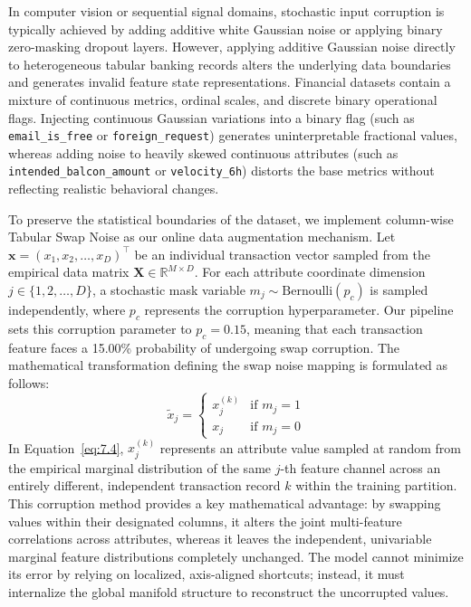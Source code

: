 In computer vision or sequential signal domains, stochastic input corruption is typically achieved by adding additive white Gaussian noise or applying binary zero-masking dropout layers. However, applying additive Gaussian noise directly to heterogeneous tabular banking records alters the underlying data boundaries and generates invalid feature state representations. Financial datasets contain a mixture of continuous metrics, ordinal scales, and discrete binary operational flags. Injecting continuous Gaussian variations into a binary flag (such as \texttt{email\_is\_free} or \texttt{foreign\_request}) generates uninterpretable fractional values, whereas adding noise to heavily skewed continuous attributes (such as \texttt{intended\_balcon\_amount} or \texttt{velocity\_6h}) distorts the base metrics without reflecting realistic behavioral changes.

To preserve the statistical boundaries of the dataset, we implement column-wise Tabular Swap Noise as our online data augmentation mechanism. Let $\mathbf{x} = (x_1, x_2, \ldots, x_D)^\top$ be an individual transaction vector sampled from the empirical data matrix $\mathbf{X} \in \mathbb{R}^{M \times D}$. For each attribute coordinate dimension $j \in \{1, 2, \ldots, D\}$, a stochastic mask variable $m_j \sim \text{Bernoulli}(p_c)$ is sampled independently, where $p_c$ represents the corruption hyperparameter. Our pipeline sets this corruption parameter to $p_c = 0.15$, meaning that each transaction feature faces a 15.00\% probability of undergoing swap corruption. The mathematical transformation defining the swap noise mapping is formulated as follows:
\begin{equation}\label{eq:7.4}
    \tilde{x}_j = \begin{cases} x_j^{(k)} & \text{if } m_j = 1 \\ x_j & \text{if } m_j = 0 \end{cases}
\end{equation}
In Equation~\eqref{eq:7.4}, $x_j^{(k)}$ represents an attribute value sampled at random from the empirical marginal distribution of the same $j$-th feature channel across an entirely different, independent transaction record $k$ within the training partition. This corruption method provides a key mathematical advantage: by swapping values within their designated columns, it alters the joint multi-feature correlations across attributes, whereas it leaves the independent, univariable marginal feature distributions completely unchanged. The model cannot minimize its error by relying on localized, axis-aligned shortcuts; instead, it must internalize the global manifold structure to reconstruct the uncorrupted values.

